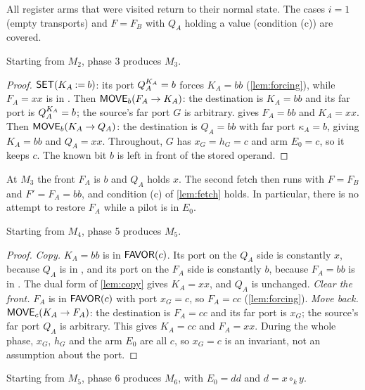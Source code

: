 All register arms that were visited return to their normal state. The cases $i=1$ (empty transports)
and $F=F_B$ with $Q_A$ holding a value (condition (c)) are covered.

\begin{lemma}\label{lem:store}
Starting from $M_2$, phase 3 produces $M_3$.
\end{lemma}

\begin{proof}
$\textsf{SET}(K_A\mathbin{:=}b)$: its port $Q_A^{K_A}=b$ forces $K_A=bb$ (\cref{lem:forcing}), while
$F_A=xx$ is in \HOLD. Then $\textsf{MOVE}_b(F_A\to K_A)$: the destination is $K_A=bb$ and its far port
is $Q_A^{K_A}=b$; the source's far port $G$ is arbitrary.  gives $F_A=bb$ and
$K_A=xx$. Then $\textsf{MOVE}_b(K_A\to Q_A)$: the destination is $Q_A=bb$ with far port $\kappa_A=b$,
giving $K_A=bb$ and $Q_A=xx$. Throughout, $G$ has $x_G=h_G=c$ and arm $E_0=c$, so it keeps $c$. The
known bit $b$ is left in front of the stored operand.
\end{proof}

At $M_3$ the front $F_A$ is $b$ and $Q_A$ holds $x$. The second fetch then runs with
$F=F_B$ and $F'=F_A=bb$, and condition (c) of \cref{lem:fetch} holds. In particular, there is no
attempt to restore $F_A$ while a pilot is in $E_0$.

\begin{lemma}\label{lem:recover}
Starting from $M_4$, phase 5 produces $M_5$.
\end{lemma}

\begin{proof}
\emph{Copy.} $K_A=bb$ is in $\textsf{FAVOR}(c)$. Its port on the $Q_A$ side is constantly $x$, because $Q_A$ is
in \HOLD, and its port on the $F_A$ side is constantly $b$, because $F_A=bb$ is in \HOLD. The dual form
of \cref{lem:copy} gives $K_A=xx$, and $Q_A$ is unchanged.
\emph{Clear the front.} $F_A$ is in $\textsf{FAVOR}(c)$ with port $x_G=c$, so $F_A=cc$ (\cref{lem:forcing}).
\emph{Move back.} $\textsf{MOVE}_c(K_A\to F_A)$: the destination is $F_A=cc$ and its far port is $x_G$;
the source's far port $Q_A$ is arbitrary. This gives $K_A=cc$ and $F_A=xx$.
During the whole phase, $x_G$, $h_G$ and the arm $E_0$ are all $c$, so $x_G=c$ is an invariant, not
an assumption about the port.
\end{proof}

\begin{lemma}\label{lem:gatestep}
Starting from $M_5$, phase 6 produces $M_6$, with $E_0=dd$ and $d=x\circ_k y$.
\end{lemma}

